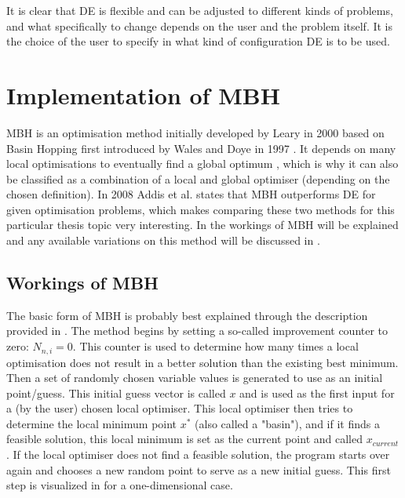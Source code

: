 It is clear that \ac{DE} is flexible and can be adjusted to different kinds of problems, and what specifically to change depends on the user and the problem itself. It is the choice of the user to specify in what kind of configuration \ac{DE} is to be used. 



\section{Implementation of \ac{MBH}}
\label{sec:impmbh}
\acl{MBH} is an optimisation method initially developed by Leary in 2000 \cite{leary2000global} based on Basin Hopping first introduced by Wales and Doye in 1997 \cite{wales1997global}. It depends on many local optimisations to eventually find a global optimum \cite{vasile2008,musegaas2012,englander2014tuning}, which is why it can also be classified as a combination of a local and global optimiser (depending on the chosen definition). In 2008 Addis et al. \cite{addis2008global} states that \ac{MBH} outperforms \ac{DE} for given optimisation problems, which makes comparing these two methods for this particular thesis topic very interesting. In  the workings of \ac{MBH} will be explained and any available variations on this method will be discussed in .




\subsection{Workings of \ac{MBH}}
\label{subsec:workmbh}
The basic form of \ac{MBH} is probably best explained through the description provided in \cite{englander2014tuning}. The method begins by setting a so-called improvement counter to zero: $N_{n,i}=0$. This counter is used to determine how many times a local optimisation does not result in a better solution than the existing best minimum. Then a set of randomly chosen variable values is generated to use as an initial point/guess. This initial guess vector is called $x$ and is used as the first input for a (by the user) chosen local optimiser. This local optimiser then tries to determine the local minimum point $x^{*}$ (also called a "basin"), and if it finds a feasible solution, this local minimum is set as the current point and called $x_{current}$. If the local optimiser does not find a feasible solution, the program starts over again and chooses a new random point to serve as a new initial guess. This first step is visualized in  for a one-dimensional case.

